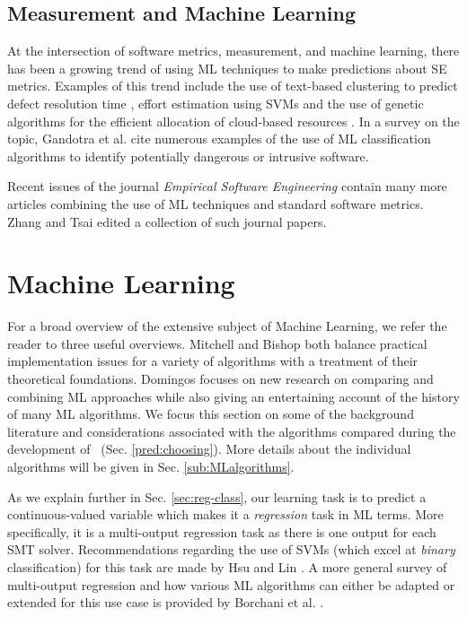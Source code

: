 \subsection{Measurement and Machine Learning}
\label{sub:lrmmml}

At the intersection of software metrics, measurement, and machine learning, there has been a growing trend of using ML techniques to make predictions about SE metrics. Examples of this trend include the use of text-based clustering to predict defect resolution time \cite{Assar2016}, effort estimation using SVMs \cite{Song:2014:PBR:2639490.2639510} and the use of genetic algorithms for the efficient allocation of cloud-based resources \cite{cloudML}. In a survey on the topic, Gandotra et al. \cite{ClassificationSurvey} cite numerous examples of the use of ML classification algorithms to identify potentially dangerous or intrusive software. 

Recent issues of the journal \textit{Empirical Software Engineering} contain many more articles combining the use of ML techniques and standard software metrics. Zhang and Tsai \cite{ML4SE} edited a collection of such journal papers.  

\section{Machine Learning}
\label{sec:lrml}

For a broad overview of the extensive subject of Machine Learning, we refer the reader to three useful overviews. 
Mitchell \cite{Mitchell} and Bishop \cite{Bishop} both balance practical implementation issues for a variety of algorithms with a treatment of their theoretical foundations. 
Domingos \cite{domingos2015master} focuses on new research on comparing and combining ML approaches while also giving an entertaining account of the history of many ML algorithms.  
We focus this section on some of the background literature and considerations associated with the algorithms compared during the development of \where~(Sec. \ref{pred:choosing}).
More details about the individual algorithms will be given in Sec. \ref{sub:MLalgorithms}.

\sloppypar
As we explain further in Sec. \ref{sec:reg-class}, our learning task is to predict a continuous-valued variable which makes it a \textit{regression} task in ML terms. 
More specifically, it is a multi-output regression task as there is one output for each SMT solver. 
Recommendations regarding the use of SVMs (which excel at \textit{binary} classification) for this task are made by Hsu and Lin \cite{MulticlassSVM}. 
A more general survey of multi-output regression and how various ML algorithms can either be adapted or extended for this use case is provided by Borchani et al. \cite{multisurvey}. 

